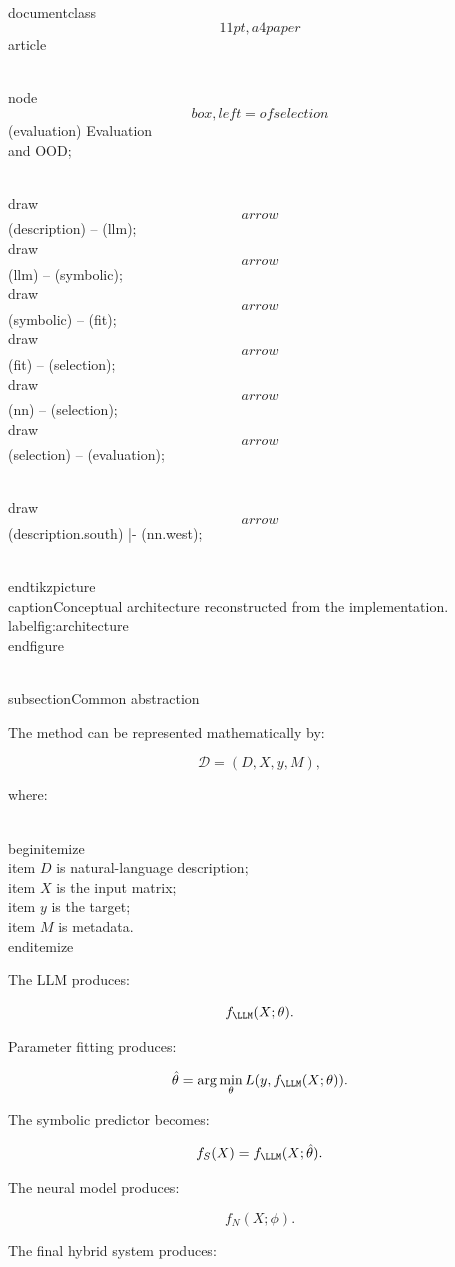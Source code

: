 \\documentclass\[11pt,a4paper\]{article}
\begin{document}
 \\node\[box, left=of selection\] (evaluation) {Evaluation\\and OOD};

 \\draw\[arrow\] (description) -- (llm);\
 \\draw\[arrow\] (llm) -- (symbolic);\
 \\draw\[arrow\] (symbolic) -- (fit);\
 \\draw\[arrow\] (fit) -- (selection);\
 \\draw\[arrow\] (nn) -- (selection);\
 \\draw\[arrow\] (selection) -- (evaluation);

 \\draw\[arrow\] (description.south) |- (nn.west);

 \\end{tikzpicture}\
 \\caption{Conceptual architecture reconstructed from the implementation.}\
 \\label{fig:architecture}\
 \\end{figure}

 \\subsection{Common abstraction}

 The method can be represented mathematically by:

 $$
\mathcal{D}
=
(D,X,y,M),
$$

 where:

 \\begin{itemize}\
 \\item $D$ is natural-language description;\
 \\item $X$ is the input matrix;\
 \\item $y$ is the target;\
 \\item $M$ is metadata.\
 \\end{itemize}

 The LLM produces:

 $$
f_{\LLM}(X;\theta).
$$

 Parameter fitting produces:

 $$
\hat{\theta}
=
\arg\min_{\theta}
L(y,f_{\LLM}(X;\theta)).
$$

 The symbolic predictor becomes:

 $$
f_S(X)=f_{\LLM}(X;\hat{\theta}).
$$

 The neural model produces:

 $$
f_N(X;\phi).
$$

 The final hybrid system produces:
\end{document}
